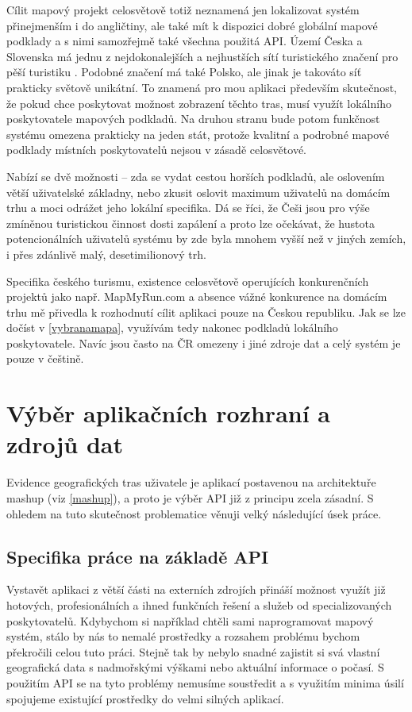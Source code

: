 Cílit mapový projekt celosvětově totiž neznamená jen lokalizovat
systém přinej\-menším i do angličtiny, ale také mít k dispozici dobré
globální mapové podklady a s nimi samozřejmě také všechna použitá
API. Území Česka a Slovenska má jednu z nej\-dokonalejších a nej\-hustších
sítí turistického značení pro pěší turistiku \cite{kct}.
Podobné značení má také Polsko, ale jinak je takováto síť prakticky světově unikátní. To
znamená pro mou aplikaci především skutečnost, že pokud chce
poskytovat možnost zobrazení těchto tras, musí využít lokálního
poskytovatele mapových podkladů. Na druhou stranu bude potom
funkčnost systému omezena prakticky na jeden stát, protože kvalitní a
podrobné mapové podklady místních poskytovatelů nejsou v zásadě
celosvětové.

Nabízí se dvě možnosti -- zda se vydat cestou horších podkladů, ale
oslovením větší uživatelské základny, nebo zkusit oslovit maximum
uživatelů na domácím trhu a moci odrážet jeho lokální specifika. Dá se
říci, že Češi jsou pro výše zmíněnou turistickou činnost dosti
zapálení \cite{turistika} a proto lze očekávat, že hustota
potencionálních uživatelů systému by zde byla mnohem vyšší než v
jiných zemích, i přes zdánlivě malý, desetimilionový trh.

Specifika českého turismu, existence celosvětově operujících
konkurenčních projektů jako např. MapMyRun.com a absence vážné
konkurence na domácím trhu mě přivedla k rozhodnutí cílit aplikaci
pouze na Českou republiku. Jak se lze dočíst v \ref{vybranamapa},
využívám tedy nakonec podkladů lokálního poskytovatele. Navíc jsou
často na ČR omezeny i jiné zdroje dat a celý systém je pouze v
češtině.

\chapter{Výběr aplikačních rozhraní a zdrojů dat}
Evidence geografických tras uživatele je aplikací postavenou na
architektuře mashup (viz \ref{mashup}), a proto je výběr API již z
principu zcela zásadní. S ohledem na tuto skutečnost problematice
věnuji velký následující úsek práce.

\section{Specifika práce na základě API}
Vystavět aplikaci z větší části na externích zdrojích přináší možnost
využít již hotových, profesionálních a ihned funkčních řešení a služeb
od specializovaných poskytovatelů. Kdybychom si například chtěli sami
naprogramovat mapový systém, stálo by nás to nemalé prostředky a
rozsahem problému bychom překročili celou tuto práci. Stejně tak by
nebylo snadné zajistit si svá vlastní geografická data s nadmořskými
výškami nebo aktuální informace o počasí. S použitím API se na tyto
problémy nemusíme soustředit a s využitím minima úsilí spojujeme
existující prostředky do velmi silných aplikací.

